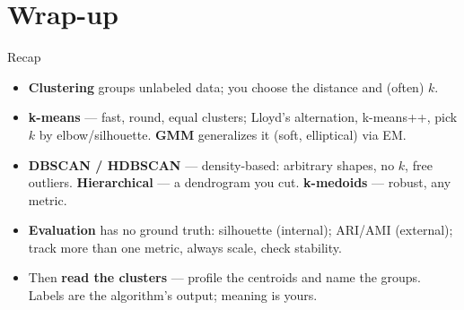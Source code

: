 \documentclass[aspectratio=169]{beamer}
\begin{document}
\section*{Wrap-up}

\begin{frame}{Recap}
  \begin{itemize}\small
    \item \textbf{Clustering} groups unlabeled data; you choose the distance and (often) $k$.
    \item \textbf{k-means} --- fast, round, equal clusters; Lloyd's alternation, k-means++,
      pick $k$ by elbow/silhouette. \textbf{GMM} generalizes it (soft, elliptical) via EM.
    \item \textbf{DBSCAN / HDBSCAN} --- density-based: arbitrary shapes, no $k$, free outliers.
      \textbf{Hierarchical} --- a dendrogram you cut. \textbf{k-medoids} --- robust, any metric.
    \item \textbf{Evaluation} has no ground truth: silhouette (internal); ARI/AMI (external);
      track more than one metric, always scale, check stability.
    \item Then \textbf{read the clusters} --- profile the centroids and name the groups. Labels
      are the algorithm's output; meaning is yours.
  \end{itemize}
  \vfill
\end{frame}
\end{document}
